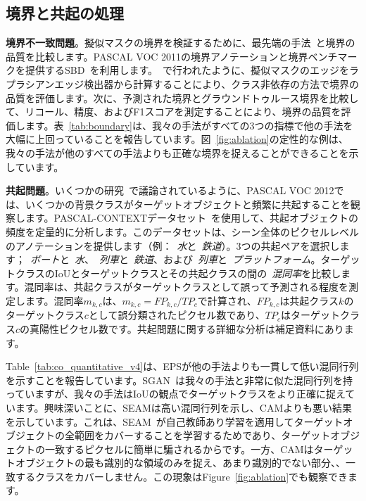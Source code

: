 \documentclass[final]{cvpr}
\begin{document}
\subsection{境界と共起の処理}\label{section:5.1}

\noindent\textbf{境界不一致問題}。擬似マスクの境界を検証するために、最先端の手法~\cite{chen2020boundary, wang2020self, zhou2016learning}と境界の品質を比較します。PASCAL VOC 2011の境界アノテーションと境界ベンチマークを提供するSBD~\cite{hariharan2011semantic}を利用します。~\cite{chen2020boundary}で行われたように、擬似マスクのエッジをラプラシアンエッジ検出器から計算することにより、クラス非依存の方法で境界の品質を評価します。次に、予測された境界とグラウンドトゥルース境界を比較して、リコール、精度、およびF1スコアを測定することにより、境界の品質を評価します。表~\ref{tab:boundary}は、我々の手法がすべての3つの指標で他の手法を大幅に上回っていることを報告しています。図~\ref{fig:ablation}の定性的な例は、我々の手法が他のすべての手法よりも正確な境界を捉えることができることを示しています。




\vspace{1mm}
\noindent \textbf{共起問題}。いくつかの研究~\cite{huang2018weakly, kolesnikov2016seed, li2018tell, oh2017exploiting}で議論されているように、PASCAL VOC 2012では、いくつかの背景クラスがターゲットオブジェクトと頻繁に共起することを観察します。PASCAL-CONTEXTデータセット~\cite{mottaghi2014role}を使用して、共起オブジェクトの頻度を定量的に分析します。このデータセットは、シーン全体のピクセルレベルのアノテーションを提供します（例：~\emph{水}と~\emph{鉄道}）。3つの共起ペアを選択します；~\emph{ボート}と~\emph{水}、~\emph{列車}と~\emph{鉄道}、および~\emph{列車}と~\emph{プラットフォーム}。ターゲットクラスのIoUとターゲットクラスとその共起クラスの間の~\emph{混同率}を比較します。混同率は、共起クラスがターゲットクラスとして誤って予測される程度を測定します。混同率$m_{k,c}$は、$m_{k,c} = FP_{k,c}/TP_{c}$で計算され、${FP_{k,c}}$は共起クラス$k$のターゲットクラス$c$として誤分類されたピクセル数であり、$TP_{c}$はターゲットクラス$c$の真陽性ピクセル数です。共起問題に関する詳細な分析は補足資料にあります。

Table~\ref{tab:co_quantitative_v4}は、EPSが他の手法よりも一貫して低い混同行列を示すことを報告しています。SGAN~\cite{yao2020saliency}は我々の手法と非常に似た混同行列を持っていますが、我々の手法はIoUの観点でターゲットクラスをより正確に捉えています。興味深いことに、SEAMは高い混同行列を示し、CAMよりも悪い結果を示しています。これは、SEAM~\cite{wang2020self}が自己教師あり学習を適用してターゲットオブジェクトの全範囲をカバーすることを学習するためであり、ターゲットオブジェクトの一致するピクセルに簡単に騙されるからです。一方、CAMはターゲットオブジェクトの最も識別的な領域のみを捉え、あまり識別的でない部分、\eg、一致するクラスをカバーしません。この現象はFigure~\ref{fig:ablation}でも観察できます。
\end{document}
